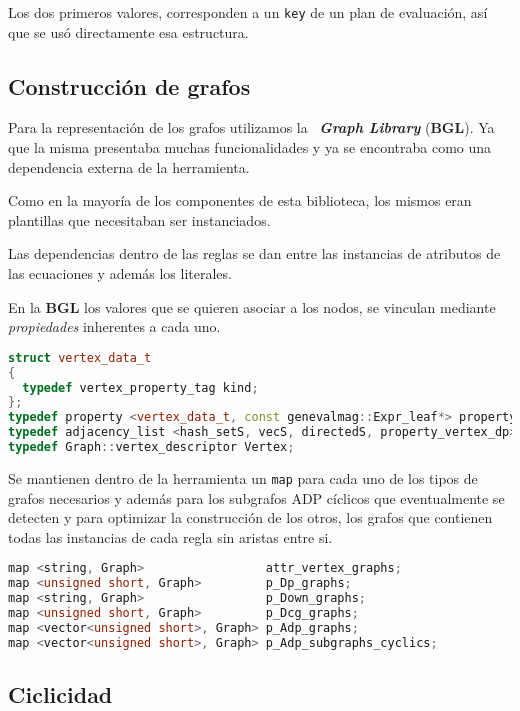 Los dos primeros valores, corresponden a un \texttt{key} de un plan de evaluación, así que se usó directamente esa estructura.

\subsection{Construcción de grafos}
\label{subsec:const-graf}
Para la representación de los grafos utilizamos la \boost\ \textit{\textbf{Graph Library}} (\textbf{BGL}). Ya que la misma presentaba muchas funcionalidades y ya se encontraba como una dependencia externa de la herramienta.

Como en la mayoría de los componentes de esta biblioteca, los mismos eran plantillas que necesitaban ser instanciados.

Las dependencias dentro de las reglas se dan entre las instancias de atributos de las ecuaciones y además los literales.

En la \textbf{BGL} los valores que se quieren asociar a los nodos, se vinculan mediante \textit{propiedades} inherentes a cada uno.

\begin{lstlisting}[language=C++, basicstyle=\scriptsize, columns=fullflexible, linewidth=13cm]
struct vertex_data_t
{
  typedef vertex_property_tag kind;
};
typedef property <vertex_data_t, const genevalmag::Expr_leaf*> property_vertex_dp;
typedef adjacency_list <hash_setS, vecS, directedS, property_vertex_dp> Graph;
typedef Graph::vertex_descriptor Vertex;
\end{lstlisting}

Se mantienen dentro de la herramienta un \texttt{map} para cada uno de los tipos de grafos necesarios y además para los subgrafos ADP cíclicos que eventualmente se detecten y para optimizar la construcción de los otros, los grafos que contienen todas las instancias de cada regla sin aristas entre si.

\begin{lstlisting}[language=C++, basicstyle=\scriptsize, linewidth=11.5cm]
map <string, Graph>                 attr_vertex_graphs;
map <unsigned short, Graph>         p_Dp_graphs;
map <string, Graph>                 p_Down_graphs;
map <unsigned short, Graph>         p_Dcg_graphs;
map <vector<unsigned short>, Graph> p_Adp_graphs;
map <vector<unsigned short>, Graph> p_Adp_subgraphs_cyclics;
\end{lstlisting}

\subsection*{Ciclicidad}

